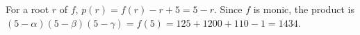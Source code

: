 For a root $r$ of $f$, $p(r)=f(r)-r+5=5-r$. Since $f$ is monic, the product is $(5-\alpha)(5-\beta)(5-\gamma)=f(5)=125+1200+110-1=\boxed{1434}$.
